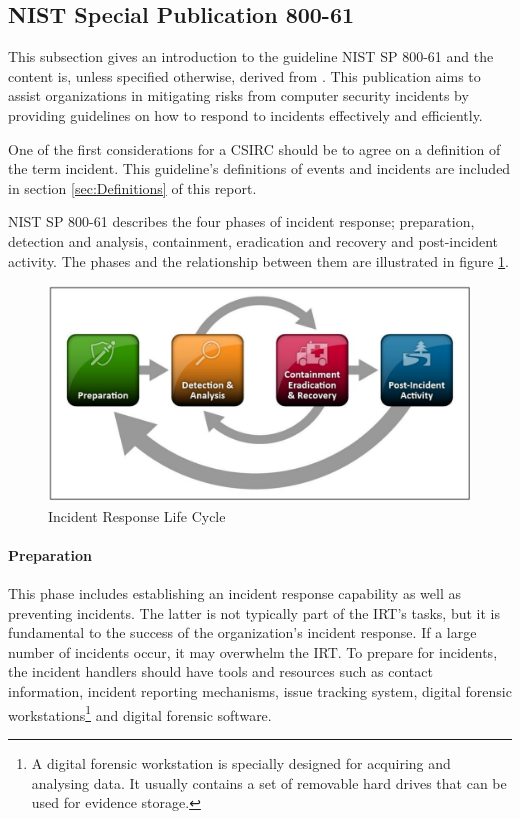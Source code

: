 \subsection{\acs{NIST} Special Publication 800-61}
This subsection gives an introduction to the guideline \acs{NIST} SP 800-61 and the content is, unless specified otherwise, derived from \cite{nist800-61}. This publication aims to  assist organizations in mitigating risks from computer security incidents by providing guidelines on how to respond to incidents effectively and efficiently. 

One of the first considerations for a \ac{CSIRC} should be to agree on a definition of the term incident. This guideline's definitions of events and incidents are included in section \ref{sec:Definitions} of this report. 

\acs{NIST} SP 800-61 describes the four phases of incident response; preparation, detection and analysis, containment, eradication and recovery and post-incident activity. The phases and the relationship between them are illustrated in figure \ref{fig:NISTIncidentResponse}.

\begin{figure}[ht]
\begin{center}
\includegraphics[scale=0.27]{NISTIncidentResponseCycle.png}
\caption[NIST Incident Response Life Cycle]{Incident Response Life Cycle \cite{nist800-61}}
\label{fig:NISTIncidentResponse}
\end{center}
\end{figure}

\paragraph{Preparation} 
This phase includes establishing an incident response capability as well as preventing incidents. The latter is not typically part of the \ac{IRT}'s tasks, but it is fundamental to the success of the organization's incident response. If a large number of incidents occur, it may overwhelm the \ac{IRT}. To prepare for incidents, the incident handlers should have tools and resources such as contact information, incident reporting mechanisms, issue tracking system, digital forensic workstations\footnote{A digital forensic workstation is specially designed for acquiring and analysing data. It usually contains a set of removable hard drives that can be used for evidence storage.} and digital forensic software.

